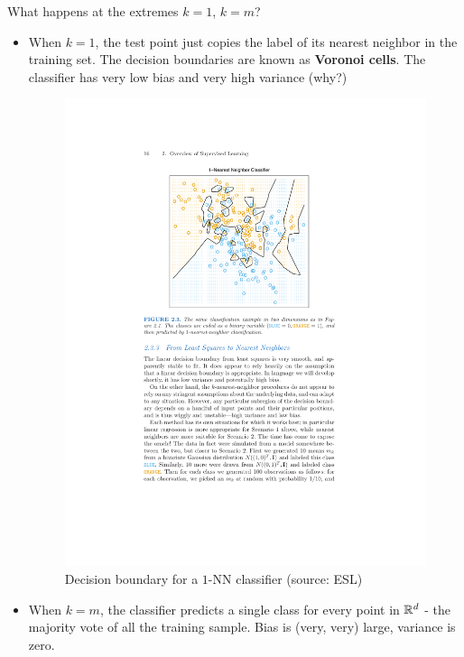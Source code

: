 What happens at the extremes $k=1$, $k=m$?
\begin{itemize}
  \item 
    When $k=1$, the test point just copies the label of its nearest neighbor in the
training set. The decision boundaries are known as {\bf Voronoi cells}. The
classifier has very low bias and very high variance (why?)

\begin{figure}[h!]
  \centering
  \includegraphics{esl_1_nn.pdf}
  \caption{Decision boundary for a $1$-NN classifier (source: ESL)}
\end{figure}

\item When $k=m$, the classifier predicts a single class for every point in
  $\mathbb{R}^d$ - the majority vote of all the training sample. Bias is (very,
  very) large, variance is zero. 
\end{itemize}

